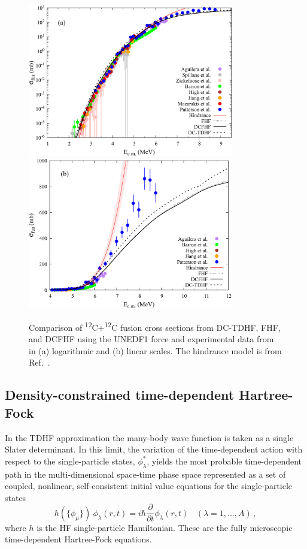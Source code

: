 \begin{figure}
	\includegraphics[width=0.8\textwidth]{../Figures/CC/CrossSections.pdf}
	\includegraphics[width=0.8\textwidth]{../Figures/CC/CrossSectionsLinear.pdf}
	\caption{Comparison of \textsuperscript{12}C+\textsuperscript{12}C fusion cross sections from DC-TDHF, FHF, and DCFHF using the UNEDF1 force and experimental data from~\protect\citep{aguilera2006,spillane2007,zickefoose2011,barron-palos2006,high1977,jiang2018,mazarakis1973,patterson1969} in (a) logarithmic and (b) linear scales. The hindrance model is from Ref.~\protect\citep{jiang2007}.}
	\label{fig:xsec}
\end{figure}

\subsection{Density-constrained time-dependent Hartree-Fock}
\label{sec:dctdhf}


In the TDHF approximation the many-body wave function is taken as a single
Slater determinant.
In this limit, the variation of the time-dependent action with respect to the single-particle states, $\phi^{*}_{\lambda}$, yields the most probable time-dependent path
in the multi-dimensional space-time phase space represented as a
set of coupled, nonlinear, self-consistent initial value equations
for the single-particle states
\begin{equation}
h(\{\phi_{\mu}\}) \ \phi_{\lambda} (r,t) = i \hbar \frac{\partial}{\partial t} \phi_{\lambda} (r,t)
\ \ \ \ (\lambda = 1,...,A)\,,
\end{equation}
where $h$ is the HF single-particle Hamiltonian.
These are the fully microscopic time-dependent Hartree-Fock equations.

